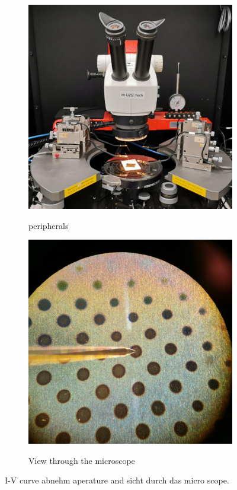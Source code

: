 \documentclass[a4paper]{article}
\begin{document}
\begin{figure}
	\centering
	\begin{subfigure}{0.48\textwidth}
		\centering
		\includegraphics[width=.9\textwidth]{Pics/i-v.png}
		\label{fig:iv-agilent}
		\caption{peripherals}
	\end{subfigure}
	\begin{subfigure}{0.48\textwidth}
		\centering
		\includegraphics[width=.9\textwidth]{Pics/i-v-micro.png}
		\label{fig:iv-micro}
		\caption{View through the microscope}
	\end{subfigure}
	\label{fig:iv}
	\caption{I-V curve abnehm aperature and sicht durch das micro scope.}
\end{figure}
\end{document}
